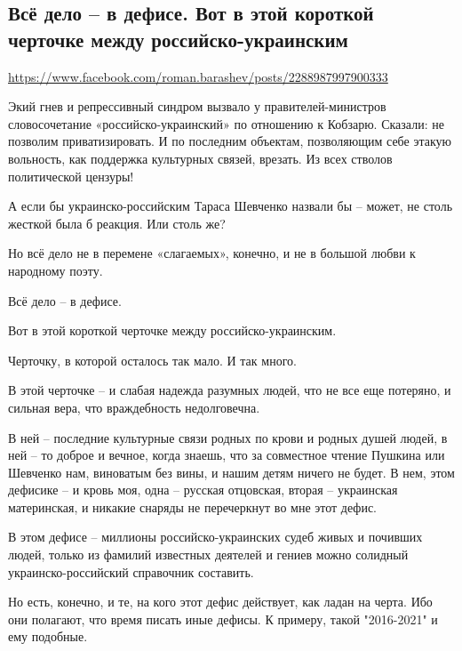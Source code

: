  
 
 
 
 

\subsection{Всё дело – в дефисе. Вот в этой короткой черточке между российско-украинским}
\url{https://www.facebook.com/roman.barashev/posts/2288987997900333}

Экий гнев и репрессивный синдром вызвало у правителей-министров словосочетание
«российско-украинский» по отношению к Кобзарю. Сказали: не позволим
приватизировать. И по последним объектам, позволяющим себе этакую вольность,
как поддержка культурных связей, врезать. Из всех стволов политической цензуры! 

А если бы украинско-российским Тараса Шевченко назвали бы – может, не столь
жесткой была б реакция. Или столь же?

Но всё дело не в перемене «слагаемых», конечно, и не в большой любви к
народному поэту.

Всё дело – в дефисе.

Вот в этой короткой черточке между российско-украинским.

Черточку, в которой осталось так мало. И так много.

В этой черточке – и слабая надежда разумных людей, что не все еще потеряно, и
сильная вера, что враждебность недолговечна.

В ней – последние культурные связи родных по крови и родных душей людей, в ней
– то доброе и вечное, когда знаешь, что за совместное чтение Пушкина или
Шевченко нам, виноватым без вины, и нашим детям ничего не будет. В нем, этом
дефисике – и кровь моя, одна – русская отцовская, вторая – украинская
материнская, и никакие снаряды не перечеркнут во мне этот дефис.

В этом дефисе – миллионы российско-украинских судеб живых и почивших людей,
только из фамилий известных деятелей и гениев можно солидный
украинско-российский справочник составить.

Но есть, конечно, и те, на кого этот дефис действует, как ладан на черта. Ибо
они полагают, что время писать иные дефисы. К примеру, такой "2016-2021" и ему
подобные.

